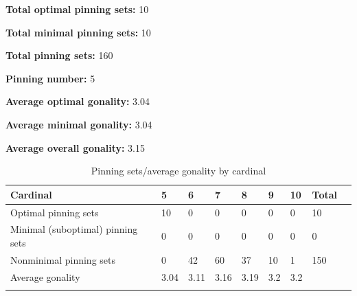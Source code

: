 \documentclass{article}%
\begin{document}
\begin{multicols}{2}
{\normalsize \noindent\textbf{Total optimal pinning sets:} 10

\noindent\textbf{Total minimal pinning sets:} 10

\noindent\textbf{Total pinning sets:} 160

\noindent\textbf{Pinning number:} 5

}
\columnbreak

{\normalsize \noindent\textbf{Average optimal gonality:} 3.04

\noindent\textbf{Average minimal gonality:} 3.04

\noindent\textbf{Average overall gonality:} 3.15

}
\end{multicols}

\begin{table}[ht]
	\caption{Pinning sets/average gonality by cardinal}
	\centering
	\renewcommand{\arraystretch}{1.5}
	\begin{tabularx}{\textwidth}{lXXXXXXXX}
		\toprule
			Cardinal & 5 & 6 & 7 & 8 & 9 & 10 & Total\\
			\hline
			Optimal pinning sets & 10 & 0 & 0 & 0 & 0 & 0 & 10 \\
			Minimal (suboptimal) pinning sets & 0 & 0 & 0 & 0 & 0 & 0 & 0 \\
			Nonminimal pinning sets & 0 & 42 & 60 & 37 & 10 & 1 & 150 \\
			Average gonality & 3.04 & 3.11 & 3.16 & 3.19 & 3.2 & 3.2 &  \\
		\bottomrule \\ 
	\end{tabularx}
\end{table}
\end{document}

